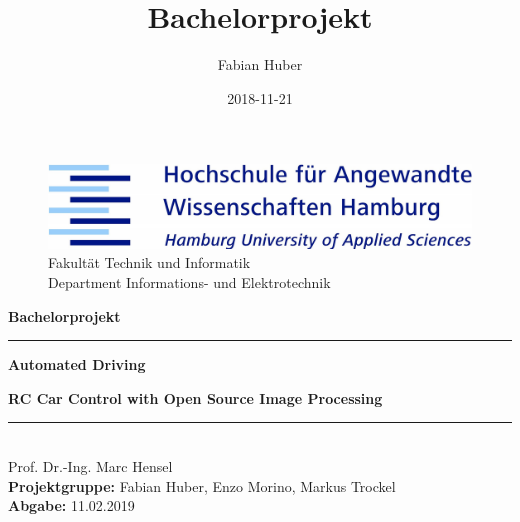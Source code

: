 \documentclass[a4paper,12pt]{article}
\title{Bachelorprojekt}
\date{2018-11-21}
\author{Fabian Huber}
\begin{document}
\begin{titlepage}
\begin{figure}[h!]
  \begin{flushright}
  \begin{spacing}{1.5}
  \includegraphics[width=.5\linewidth]{images/hawlogo.png}
  \label{fig:hawlogo}\\
  \small Fakultät Technik und Informatik\\
  \small Department Informations- und Elektrotechnik
  \end{spacing}
  \end{flushright}
\end{figure}
\textbf{\large Bachelorprojekt}
\begin{center}\noindent\textcolor{blue(ncs)}{\rule{13.5cm}{0.5mm}}\end{center}
\begin{spacing}{4.5}
\textbf{\huge Automated Driving}
\end{spacing}
\textbf{\large\indent RC Car Control with Open Source Image Processing}
\begin{center}\noindent\textcolor{blue(ncs)}{\rule{13.5cm}{0.5mm}}\end{center}
\begin{spacing}{1.15}
\vspace*{\fill}
\noindent
\textnormal{\\
  Prof. Dr.-Ing. Marc Hensel \\
  \textbf{Projektgruppe:} Fabian Huber, Enzo Morino, Markus Trockel \\
  \textbf{Abgabe:} 11.02.2019 \\
}
\end{spacing}
\end{titlepage}


	\newpage
	
	
  \newpage
  \tableofcontents
  \newpage




	\newpage
  
 
\end{document}
